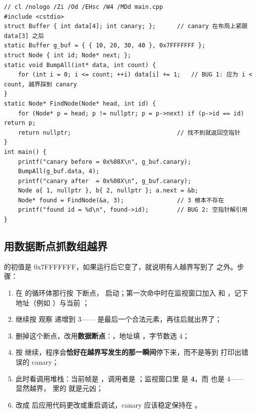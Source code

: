 {{\begin{lstlisting}[style=cppstyle]
// cl /nologo /Zi /Od /EHsc /W4 /MDd main.cpp
#include <cstdio>
struct Buffer { int data[4]; int canary; };      // canary 在布局上紧跟 data[3] 之后
static Buffer g_buf = { { 10, 20, 30, 40 }, 0x7FFFFFFF };
struct Node { int id; Node* next; };
static void BumpAll(int* data, int count) {
    for (int i = 0; i <= count; ++i) data[i] += 1;   // BUG 1: 应为 i < count, 越界踩到 canary
}
static Node* FindNode(Node* head, int id) {
    for (Node* p = head; p != nullptr; p = p->next) if (p->id == id) return p;
    return nullptr;                              // 找不到就返回空指针
}
int main() {
    printf("canary before = 0x%08X\n", g_buf.canary);
    BumpAll(g_buf.data, 4);
    printf("canary after  = 0x%08X\n", g_buf.canary);
    Node a{ 1, nullptr }, b{ 2, nullptr }; a.next = &b;
    Node* found = FindNode(&a, 3);               // 3 根本不存在
    printf("found id = %d\n", found->id);        // BUG 2: 空指针解引用
}
\end{lstlisting}
\subsection{用数据断点抓数组越界}

 的初值是 0x7FFFFFFF，如果运行后它变了，就说明有人越界写到了  之外。步骤：

\begin{enumerate}
  \item 在  的循环体那行按  下断点， 启动；第一次命中时在监视窗口加入  和 ，记下地址（例如 ）与当前 ；
  \item 继续按  观察  递增到 3—— 是最后一个合法元素，再往后就出界了；
  \item 删掉这个断点，改用\textbf{数据断点}：，地址填 ，字节数选 4；
  \item 按  继续，程序会\textbf{恰好在越界写发生的那一瞬间}停下来，而不是等到  打印出错误的 canary；
  \item 此时看调用堆栈：当前帧是 ，调用者是 ；监视窗口里  是 \textbf{4}，而  也是 4—— 显然越界， 里的 \code{<=} 就是元凶；
  \item 改成  后应用代码更改或重启调试，canary 应该稳定保持在 。
\end{enumerate}

}}
